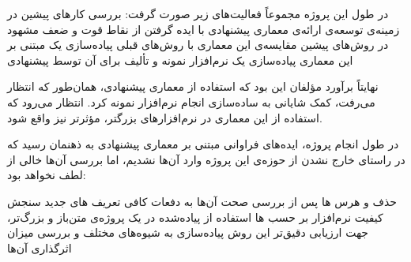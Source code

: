 
در طول این پروژه مجموعاً فعالیت‌های زیر صورت گرفت:
 بررسی کارهای پیشین در زمینه‌ی توسعه‌ی 
 ارائه‌ی معماری پیشنهادی با ایده گرفتن از نقاط قوت و ضعف مشهود در روش‌های پیشین
 مقایسه‌ی این معماری با روش‌های قبلی
 پیاده‌سازی یک   مبتنی بر این معماری
 پیاده‌سازی یک نرم‌افزار نمونه و تألیف  برای آن توسط  پیشنهادی

نهایتاً برآورد مؤلفان این بود که استفاده از معماری پیشنهادی، همان‌طور که انتظار می‌رفت، کمک شایانی به ساده‌سازی انجام  نرم‌افزار نمونه کرد. انتظار می‌رود که استفاده از این معماری در  نرم‌افزارهای بزرگتر، مؤثرتر نیز واقع شود.

در طول انجام پروژه، ایده‌های فراوانی مبتنی بر معماری پیشنهادی به ذهنمان رسید که در راستای خارج نشدن از حوزه‌ی این پروژه وارد آن‌ها نشدیم، اما بررسی آن‌ها خالی از لطف نخواهد بود:

 حذف و هرس ‌ها پس از بررسی صحت آن‌ها به دفعات کافی
 تعریف ‌های جدید سنجش کیفیت نرم‌افزار بر حسب ‌ها
 استفاده از   پیاده‌شده در یک پروژه‌ی متن‌باز و بزرگ‌تر، جهت ارزیابی دقیق‌تر این روش
 پیاده‌سازی  به شیوه‌های مختلف و بررسی میزان اثرگذاری آن‌ها
